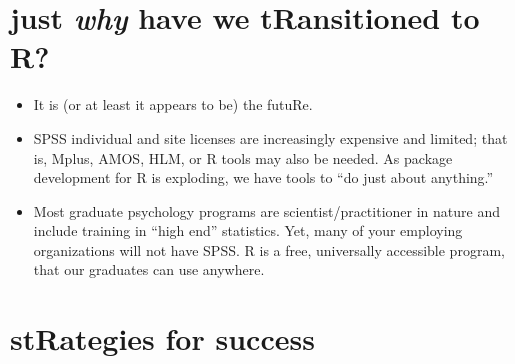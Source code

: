 \documentclass[
  11pt,
]{book}
\providecommand{\tightlist}{%
  \setlength{\itemsep}{0pt}\setlength{\parskip}{0pt}}
\begin{document}
\hypertarget{just-why-have-we-transitioned-to-r}{%
\section{\texorpdfstring{just \emph{why} have we tRansitioned to R?}{just why have we tRansitioned to R?}}\label{just-why-have-we-transitioned-to-r}}

\begin{itemize}
\tightlist
\item
  It is (or at least it appears to be) the futuRe.
\item
  SPSS individual and site licenses are increasingly expensive and limited; that is, Mplus, AMOS, HLM, or R tools may also be needed. As package development for R is exploding, we have tools to ``do just about anything.''
\item
  Most graduate psychology programs are scientist/practitioner in nature and include training in ``high end'' statistics. Yet, many of your employing organizations will not have SPSS. R is a free, universally accessible program, that our graduates can use anywhere.
\end{itemize}

\hypertarget{strategies-for-success}{%
\section{stRategies for success}\label{strategies-for-success}}
\end{document}
